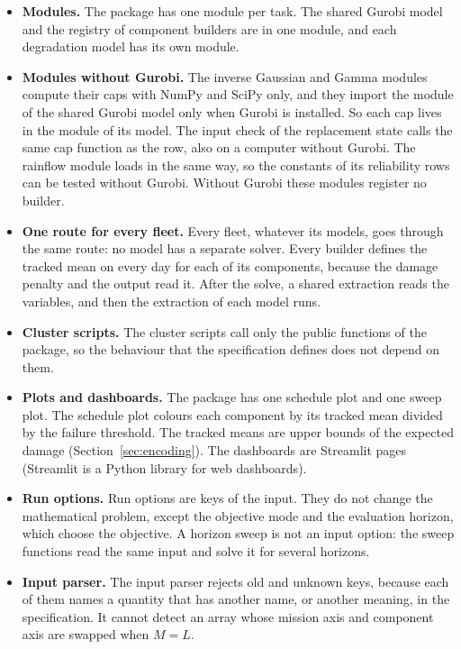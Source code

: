 \documentclass[11pt,a4paper]{article}
\theoremstyle{plain}
\theoremstyle{definition}
\theoremstyle{remark}
\begin{document}
\begin{itemize}
  \item \textbf{Modules.}
    The package has one module per task.
    The shared Gurobi model and the registry of component builders are in one module, and each degradation model has its own module.
  \item \textbf{Modules without Gurobi.}
    The inverse Gaussian and Gamma modules compute their caps with NumPy and SciPy only, and they import the module of the shared Gurobi model only when Gurobi is installed.
    So each cap lives in the module of its model.
    The input check of the replacement state calls the same cap function as the row, also on a computer without Gurobi.
    The rainflow module loads in the same way, so the constants of its reliability rows can be tested without Gurobi.
    Without Gurobi these modules register no builder.
  \item \textbf{One route for every fleet.}
    Every fleet, whatever its models, goes through the same route: no model has a separate solver.
    Every builder defines the tracked mean on every day for each of its components, because the damage penalty and the output read it.
    After the solve, a shared extraction reads the variables, and then the extraction of each model runs.
  \item \textbf{Cluster scripts.}
    The cluster scripts call only the public functions of the package, so the behaviour that the specification defines does not depend on them.
  \item \textbf{Plots and dashboards.}
    The package has one schedule plot and one sweep plot.
    The schedule plot colours each component by its tracked mean divided by the failure threshold.
    The tracked means are upper bounds of the expected damage (Section~\ref{sec:encoding}).
    The dashboards are Streamlit pages (Streamlit is a Python library for web dashboards).
  \item \textbf{Run options.}
    Run options are keys of the input.
    They do not change the mathematical problem, except the objective mode and the evaluation horizon, which choose the objective.
    A horizon sweep is not an input option: the sweep functions read the same input and solve it for several horizons.
  \item \textbf{Input parser.}
    The input parser rejects old and unknown keys, because each of them names a quantity that has another name, or another meaning, in the specification.
    It cannot detect an array whose mission axis and component axis are swapped when $M = L$.
\end{itemize}
\end{document}
